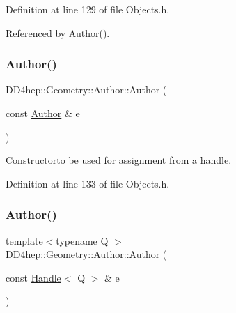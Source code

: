 Definition at line 129 of file Objects.\+h.



Referenced by Author().

\hypertarget{class_d_d4hep_1_1_geometry_1_1_author_a9f58da7da25568979eac0c706e6f9d88}{}\label{class_d_d4hep_1_1_geometry_1_1_author_a9f58da7da25568979eac0c706e6f9d88} 
\subsubsection{\texorpdfstring{Author()}{Author()}\hspace{0.1cm}{\footnotesize\ttfamily [2/4]}}
{\footnotesize\ttfamily D\+D4hep\+::\+Geometry\+::\+Author\+::\+Author (\begin{DoxyParamCaption}\item[{const \hyperlink{class_d_d4hep_1_1_geometry_1_1_author}{Author} \&}]{e }\end{DoxyParamCaption})\hspace{0.3cm}{\ttfamily [inline]}}



Constructorto be used for assignment from a handle. 



Definition at line 133 of file Objects.\+h.

\hypertarget{class_d_d4hep_1_1_geometry_1_1_author_addc7cfd45bbc61c06328da0006150226}{}\label{class_d_d4hep_1_1_geometry_1_1_author_addc7cfd45bbc61c06328da0006150226} 
\subsubsection{\texorpdfstring{Author()}{Author()}\hspace{0.1cm}{\footnotesize\ttfamily [3/4]}}
{\footnotesize\ttfamily template$<$typename Q $>$ \\
D\+D4hep\+::\+Geometry\+::\+Author\+::\+Author (\begin{DoxyParamCaption}\item[{const \hyperlink{class_d_d4hep_1_1_handle}{Handle}$<$ Q $>$ \&}]{e }\end{DoxyParamCaption})\hspace{0.3cm}{\ttfamily [inline]}}



